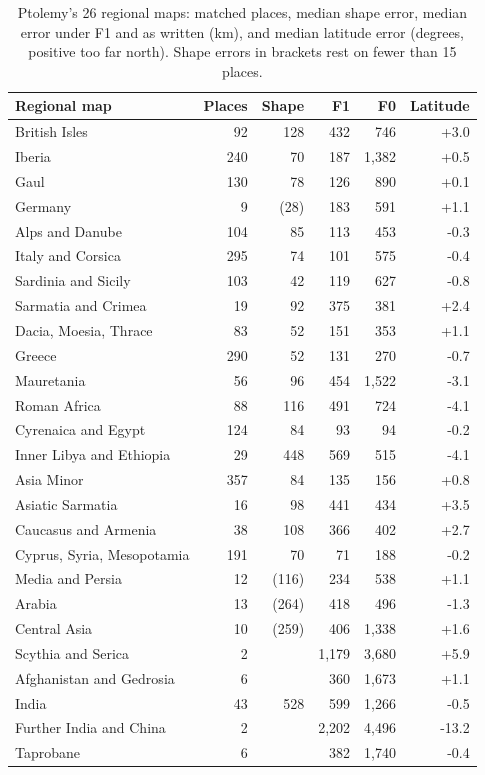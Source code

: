 \documentclass[11pt,a4paper]{article}
\begin{document}
\begin{table}[tbp]\centering\small\caption{Ptolemy's 26 regional maps: matched places, median shape error, median error under F1 and as written (km), and median latitude error (degrees, positive too far north). Shape errors in brackets rest on fewer than 15 places.}\label{tab:regions}\begin{tabular}{lrrrrr}\toprule Regional map & Places & Shape & F1 & F0 & Latitude\\\midrule
British Isles & 92 & 128 & 432 & 746 & +3.0\\
Iberia & 240 & 70 & 187 & 1,382 & +0.5\\
Gaul & 130 & 78 & 126 & 890 & +0.1\\
Germany & 9 & (28) & 183 & 591 & +1.1\\
Alps and Danube & 104 & 85 & 113 & 453 & -0.3\\
Italy and Corsica & 295 & 74 & 101 & 575 & -0.4\\
Sardinia and Sicily & 103 & 42 & 119 & 627 & -0.8\\
Sarmatia and Crimea & 19 & 92 & 375 & 381 & +2.4\\
Dacia, Moesia, Thrace & 83 & 52 & 151 & 353 & +1.1\\
Greece & 290 & 52 & 131 & 270 & -0.7\\
Mauretania & 56 & 96 & 454 & 1,522 & -3.1\\
Roman Africa & 88 & 116 & 491 & 724 & -4.1\\
Cyrenaica and Egypt & 124 & 84 & 93 & 94 & -0.2\\
Inner Libya and Ethiopia & 29 & 448 & 569 & 515 & -4.1\\
Asia Minor & 357 & 84 & 135 & 156 & +0.8\\
Asiatic Sarmatia & 16 & 98 & 441 & 434 & +3.5\\
Caucasus and Armenia & 38 & 108 & 366 & 402 & +2.7\\
Cyprus, Syria, Mesopotamia & 191 & 70 & 71 & 188 & -0.2\\
Media and Persia & 12 & (116) & 234 & 538 & +1.1\\
Arabia & 13 & (264) & 418 & 496 & -1.3\\
Central Asia & 10 & (259) & 406 & 1,338 & +1.6\\
Scythia and Serica & 2 &  & 1,179 & 3,680 & +5.9\\
Afghanistan and Gedrosia & 6 &  & 360 & 1,673 & +1.1\\
India & 43 & 528 & 599 & 1,266 & -0.5\\
Further India and China & 2 &  & 2,202 & 4,496 & -13.2\\
Taprobane & 6 &  & 382 & 1,740 & -0.4\\
\bottomrule\end{tabular}\end{table}
\end{document}
